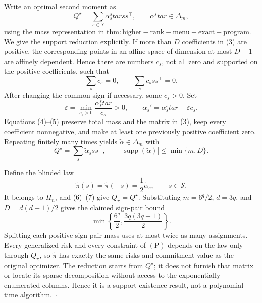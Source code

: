 Write an optimal second moment as
\[
Q^\star=\sum_{s\in\mathscr S}\alpha_s^star ss^\top,
\qquad \alpha^star\in\Delta_m, \tag{3}
\]
using the mass representation in \(\mathrm{thm:higher-rank-menu-exact-program}\).  We give the support reduction explicitly.  If more than \(D\) coefficients in (3) are positive, the corresponding points in an affine space of dimension at most \(D-1\) are affinely dependent.  Hence there are numbers \(c_s\), not all zero and supported on the positive coefficients, such that
\[
\sum_sc_s=0,
\qquad
\sum_sc_sss^\top=0. \tag{4}
\]
After changing the common sign if necessary, some \(c_s>0\).  Set
\[
\varepsilon=\min_{c_s>0}\frac{\alpha_s^star}{c_s}>0,
\qquad
\alpha_s'=\alpha_s^star-\varepsilon c_s. \tag{5}
\]
Equations (4)--(5) preserve total mass and the matrix in (3), keep every coefficient nonnegative, and make at least one previously positive coefficient zero.  Repeating finitely many times yields \(\widetilde\alpha\in\Delta_m\) with
\[
Q^\star=\sum_s\widetilde\alpha_sss^\top,
\qquad
|\operatorname{supp}(\widetilde\alpha)|\le\min\{m,D\}. \tag{6}
\]

Define the blinded law
\[
\widetilde\pi(s)=\widetilde\pi(-s)=\frac12\widetilde\alpha_s,
\qquad s\in\mathscr S. \tag{7}
\]
It belongs to \(\Pi_n\), and (6)--(7) give \(Q_{\widetilde\pi}=Q^\star\).  Substituting \(m=6^q/2\), \(d=3q\), and \(D=d(d+1)/2\) gives the claimed sign-pair bound
\[
\min\left\{\frac{6^q}{2},\frac{3q(3q+1)}2\right\}. \tag{8}
\]
Splitting each positive sign-pair mass uses at most twice as many assignments.  Every generalized risk and every constraint of \((\mathrm P)\) depends on the law only through \(Q_\pi\), so \(\widetilde\pi\) has exactly the same risks and commitment value as the original optimizer.  The reduction starts from \(Q^\star\); it does not furnish that matrix or locate its sparse decomposition without access to the exponentially enumerated columns.  Hence it is a support-existence result, not a polynomial-time algorithm. \(\square\)
